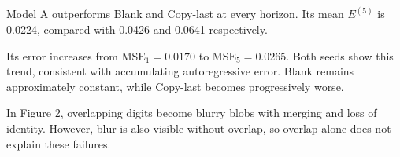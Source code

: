 Model A outperforms Blank and Copy-last at every horizon. Its mean $E^{(5)}$ is 0.0224, compared with 0.0426 and 0.0641 respectively.

Its error increases from $\mathrm{MSE}_1=0.0170$ to $\mathrm{MSE}_5=0.0265$. Both seeds show this trend, consistent with accumulating autoregressive error. Blank remains approximately constant, while Copy-last becomes progressively worse.

In Figure 2, overlapping digits become blurry blobs with merging and loss of identity. However, blur is also visible without overlap, so overlap alone does not explain these failures.
